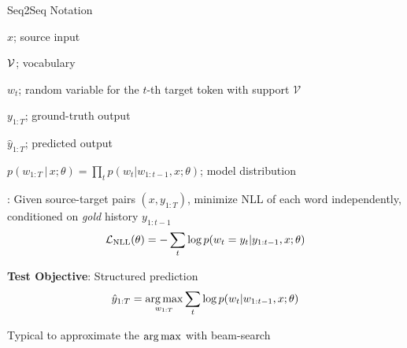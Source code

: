 \documentclass{beamer}
\let\tempone\itemize
\let\temptwo\enditemize
\renewenvironment{itemize}{\tempone\addtolength{\itemsep}{0.5\baselineskip}}{\temptwo}
\newcommand{\air}{\vspace{0.25cm}}
\newcommand{\given}{\,|\,}
\newcommand{\mcV}{\mathcal{V}}
\def\argmax{\operatornamewithlimits{arg\,max}}
\def\argmax{\operatornamewithlimits{arg\,max}}
\begin{document}
\begin{frame}
  \centerline{Seq2Seq Notation}
 
  \begin{itemize}
  \item $x$; source input 
  \item $\cal V$; vocabulary
  \item $w_t$; random variable for the $t$-th target token with support $\mcV$ 
  \item $y_{1:T}$; ground-truth output 
  \item $\hat{y}_{1:T}$; predicted output 
  \item  $p(w_{1:T} \given x ;\theta)= \prod_{t} p(w_t | w_{1:t-1}, x; \theta)$; model distribution \
  \end{itemize}
\end{frame}


\begin{frame}
  \textbf{}: Given source-target pairs $(x, y_{1:T})$, minimize NLL of each word independently, conditioned on \textit{gold} history $y_{1:t-1}$
\begin{align*}
{\cal L}_{\text{NLL}}(\theta) = -\sum_{t} \log p(w_{t} = y_t | y_{1:t-1}, x; \theta) 
\end{align*}

  \air

\textbf{\alert{Test Objective}}:  Structured prediction
  \begin{align*}
  \hat{y}_{1:T} = \argmax_{w_{1:T}} \sum_{t} \log p(w_{t} | w_{1:t-1}, x; \theta)
\end{align*}
\begin{itemize}
\item Typical to approximate the $\argmax$ with beam-search
\end{itemize}
\end{frame}
\end{document}
